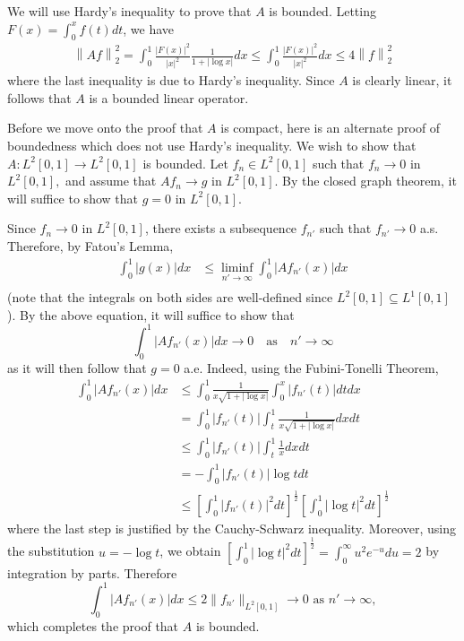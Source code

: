 \documentclass[answers]{exam}
\theoremstyle{problemstyle}
\newcommand{\norm}[1]{\left\lVert#1\right\rVert} %
\newcommand{\1}[1]{\textbf{1}_{\left[#1\right]}} %
\begin{document}
\begin{questions}
\begin{solution}
  We will use Hardy's inequality to prove that $A$ is bounded. Letting $F(x) = \int_{0}^{x}f(t)dt$, we have
  \begin{align*}
    \norm{Af}_{2}^{2} = \int_{0}^{1}\frac{|F(x)|^{2}}{|x|^{2}} \frac{1}{1+|\log x|}dx \leq \int_{0}^{1}\frac{|F(x)|^{2}}{|x|^{2}}dx \leq 4 \norm{f}^{2}_{2}
  \end{align*}
  where the last inequality is due to Hardy's inequality. Since $A$ is clearly linear, it follows that $A$ is a bounded linear operator.
  
  Before we move onto the proof that $A$ is compact, here is an alternate proof of boundedness which does not use Hardy's inequality. We wish to show that $A:L^{2}[0,1]\to L^{2}[0,1]$ is
bounded. Let $f_{n}\in L^{2}[0,1]$ such that $f_{n}\to 0$ in $L^{2}[0,1],$ and
assume that $Af_{n}\to g$ in $L^{2}[0,1].$ By the closed graph theorem, it will
suffice to show that $g=0$ in $L^{2}[0,1].$  


Since $f_{n}\to 0$ in $L^{2}[0,1]$, there exists a subsequence $f_{n'}$ such
that $f_{n'}\to 0$ a.s. Therefore, by Fatou's Lemma,
\begin{align*}
  \int_{0}^{1}|g(x)|dx 
  &\leq \liminf_{n'\to\infty}\int_{0}^{1}|Af_{n'}(x)|dx \\
\end{align*}
(note that the integrals on both sides are well-defined since
$L^{2}[0,1]\subseteq L^{1}[0,1]$).
By the above equation, it will suffice to show that
\begin{equation*}
  \int_{0}^{1}|Af_{n'}(x)|dx \to 0
  \quad \text{as} \quad n'\to \infty
\end{equation*}
as it will then follow that $g=0$ a.e. Indeed, using the Fubini-Tonelli Theorem,
\begin{align*}
  \int_{0}^{1}|Af_{n'}(x)|dx
  &\leq \int_{0}^{1}\frac{1}{x \sqrt{1+|\log x|}} \int_{0}^{x}|f_{n'}(t)|dt dx\\ 
  &= \int_{0}^{1}|f_{n'}(t)| \int_{t}^{1}\frac{1}{x \sqrt{1+|\log x|}}  dx dt\\
  &\leq \int_{0}^{1}|f_{n'}(t)| \int_{t}^{1}\frac{1}{x}dxdt\\  
  &= -\int_{0}^{1}|f_{n'}(t)| \log t dt\\
  &\leq \left[ \int_{0}^{1}|f_{n'}(t)|^{2}dt  \right]^{\frac{1}{2}}\left[ \int_{0}^{1} |\log t|^{2} dt \right]^{\frac{1}{2}}
\end{align*}
where the last step is justified by the Cauchy-Schwarz inequality. Moreover,
using the substitution $u = -\log t$, we obtain
$\left[ \int_{0}^{1} |\log t|^{2} dt \right]^{\frac{1}{2}} =
\int_{0}^{\infty}u^{2}e^{-u}du=2$ by integration by parts. Therefore
\begin{equation*}
  \int_{0}^{1}|Af_{n'}(x)|dx \leq  2 \|f_{n'}\|_{L^{2}[0,1]} \to 0 \text{ as }n'\to \infty,
\end{equation*}
which completes the proof that $A$ is bounded.




\end{solution}
\end{questions}
\end{document}
